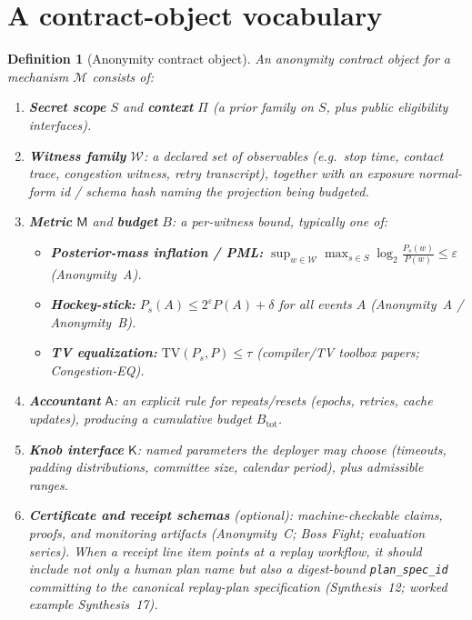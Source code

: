 \documentclass[11pt]{article}
\newtheorem{definition}{Definition}
\newcommand{\TV}{\mathrm{TV}}
\newcommand{\eps}{\varepsilon}
\newcommand{\logtwo}{\log_2}
\begin{document}
\section{A contract-object vocabulary}
\begin{definition}[Anonymity contract object]\label{def:contract}
An \emph{anonymity contract object} for a mechanism $\mathcal M$ consists of:
\begin{enumerate}[leftmargin=*]
\item \textbf{Secret scope} $S$ and \textbf{context} $\Pi$ (a prior family on $S$, plus public eligibility interfaces).
\item \textbf{Witness family} $\mathcal W$: a declared set of observables (e.g.\ stop time, contact trace, congestion witness, retry transcript), together with an exposure normal-form id / schema hash naming the projection being budgeted.\cite{series:traceifaces}
\item \textbf{Metric} $\mathsf M$ and \textbf{budget} $B$: a per-witness bound, typically one of:
  \begin{itemize}
  \item \textbf{Posterior-mass inflation / PML:} $\sup_{w\in\mathcal W}\max_{s\in S}\logtwo\frac{P_s(w)}{P(w)}\le \eps$ (Anonymity~A).
  \item \textbf{Hockey-stick:} $P_s(A)\le 2^\eps P(A)+\delta$ for all events $A$ (Anonymity~A / Anonymity~B).
  \item \textbf{TV equalization:} $\TV(P_s, P)\le \tau$ (compiler/TV toolbox papers; Congestion-EQ).
  \end{itemize}
\item \textbf{Accountant} $\mathsf A$: an explicit rule for repeats/resets (epochs, retries, cache updates), producing a cumulative budget $B_{\mathrm{tot}}$.
\item \textbf{Knob interface} $\mathsf K$: named parameters the deployer may choose (timeouts, padding distributions, committee size, calendar period), plus admissible ranges.
\item \textbf{Certificate and receipt schemas} (optional): machine-checkable claims, proofs, and monitoring artifacts (Anonymity~C; Boss Fight; evaluation series). When a receipt line item points at a replay workflow, it should include not only a human plan name but also a digest-bound \texttt{plan\_spec\_id} committing to the canonical replay-plan specification (Synthesis~12; worked example Synthesis~17).
\end{enumerate}
\end{definition}
\end{document}
